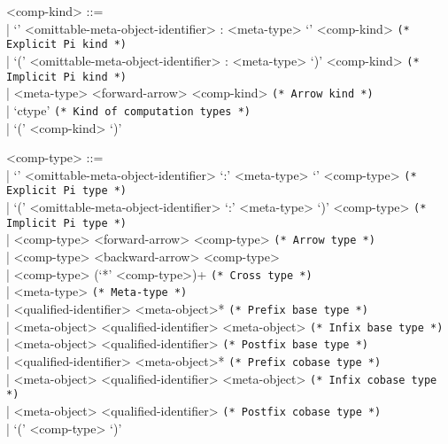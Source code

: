 \documentclass[11pt]{article}
\begin{document}
\begin{grammar}
<comp-kind> ::= \hfill\\
| `{' <omittable-meta-object-identifier> : <meta-type> `}' <comp-kind> \hfill \texttt{(* Explicit Pi kind *)}\\
| `(' <omittable-meta-object-identifier> : <meta-type> `)' <comp-kind> \hfill \texttt{(* Implicit Pi kind *)}\\
| <meta-type> <forward-arrow> <comp-kind> \hfill \texttt{(* Arrow kind *)}\\
| `ctype' \hfill \texttt{(* Kind of computation types *)}\\
| `(' <comp-kind> `)'

<comp-type> ::= \hfill\\
| `{' <omittable-meta-object-identifier> `:' <meta-type> `}' <comp-type> \hfill \texttt{(* Explicit Pi type *)}\\
| `(' <omittable-meta-object-identifier> `:' <meta-type> `)' <comp-type> \hfill \texttt{(* Implicit Pi type *)}\\
| <comp-type> <forward-arrow> <comp-type> \hfill \texttt{(* Arrow type *)}\\
| <comp-type> <backward-arrow> <comp-type>\\
| <comp-type> (`*' <comp-type>)+ \hfill \texttt{(* Cross type *)}\\
| <meta-type> \hfill \texttt{(* Meta-type *)}\\
| <qualified-identifier> <meta-object>* \hfill \texttt{(* Prefix base type *)}\\
| <meta-object> <qualified-identifier> <meta-object> \hfill \texttt{(* Infix base type *)}\\
| <meta-object> <qualified-identifier> \hfill \texttt{(* Postfix base type *)}\\
| <qualified-identifier> <meta-object>* \hfill \texttt{(* Prefix cobase type *)}\\
| <meta-object> <qualified-identifier> <meta-object> \hfill \texttt{(* Infix cobase type *)}\\
| <meta-object> <qualified-identifier> \hfill \texttt{(* Postfix cobase type *)}\\
| `(' <comp-type> `)'


\end{grammar}
\end{document}
